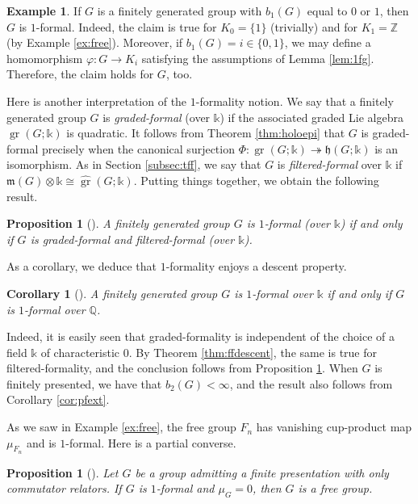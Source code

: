 \documentclass{article}
\numberwithin{equation}{section}
\newtheorem{corollary}[theorem]{Corollary}
\newtheorem{proposition}[theorem]{Proposition}
\theoremstyle{definition}
\newtheorem{example}[theorem]{Example}
\newcommand{\Z}{\mathbb{Z}}
\newcommand{\Q}{\mathbb{Q}}
\renewcommand{\k}{\mathbb{k}}
\newcommand{\h}{{\mathfrak{h}}}
\newcommand{\m}{{\mathfrak{m}}}
\DeclareMathOperator{\gr}{gr}
\newcommand{\surj}{\twoheadrightarrow}
\begin{document}
\begin{example}
\label{ex:low-betti}
If $G$ is a finitely generated group with $b_1(G)$ equal to $0$ or $1$, 
then $G$ is $1$-formal. Indeed, the claim is true for $K_0=\{1\}$ (trivially) 
and for $K_1=\Z$ (by Example \ref{ex:free}). Moreover, if $b_1(G)=i\in \{0,1\}$, 
we may define a homomorphism $\varphi\colon G\to K_i$ 
satisfying the assumptions of Lemma \ref{lem:1fg}. Therefore, 
the claim holds for $G$, too.
\end{example}

Here is another interpretation of the $1$-formality notion. We say that 
a finitely generated group $G$ is {\em graded-formal}\/ (over 
$\k$) if the associated graded 
Lie algebra $\gr(G;\k)$ is quadratic.  It follows from 
Theorem \ref{thm:holoepi} that $G$ is graded-formal 
precisely when the canonical surjection 
$\Phi\colon \gr(G;\k)\surj  \h(G;\k)$ is an isomorphism. 
As in Section  \ref{subsec:tff}, we say that $G$ is {\em filtered-formal}\/ 
over $\k$ if $\m(G)\otimes \k \cong \widehat{\gr}(G;\k)$. Putting 
things together, we obtain the following result.

\begin{proposition}[\cite{SW-forum}]
\label{prop:qwformal}
A finitely generated group $G$ is $1$-formal (over $\k$) if and only if $G$ is 
graded-formal and filtered-formal (over $\k$).
\end{proposition}

As a corollary, we deduce that $1$-formality enjoys a descent property.

\begin{corollary}[\cite{SW-forum}]
\label{cor:formal-kq}
A finitely generated group $G$ is $1$-formal over $\k$ if and only if $G$ is 
$1$-formal over $\Q$.
\end{corollary}

Indeed, it is easily seen that graded-formality is independent of the choice 
of a field $\k$ of characteristic $0$. By Theorem \ref{thm:ffdescent}, 
the same is true for filtered-formality, and the conclusion follows 
from Proposition \ref{prop:qwformal}.  When $G$ is finitely presented, 
we have that $b_2(G)<\infty$, and the result also follows from 
Corollary \ref{cor:pfext}.

As we saw in Example \ref{ex:free}, the free group $F_n$ 
has vanishing cup-product map $\mu_{F_n}$ and is 
$1$-formal.  Here is a partial converse.

\begin{proposition}[\cite{DPS-duke}]
\label{prop:commrel}
Let $G$ be a group admitting a finite presentation with 
only commutator relators. If $G$ is $1$-formal and 
$\mu_G=0$, then $G$ is a free group. 
\end{proposition}
\end{document}
